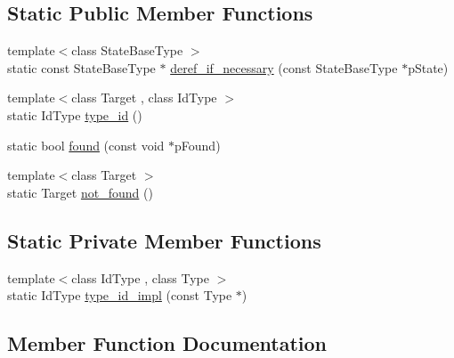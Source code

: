 \subsection*{Static Public Member Functions}
\begin{DoxyCompactItemize}
\item 
{\footnotesize template$<$class State\+Base\+Type $>$ }\\static const State\+Base\+Type $\ast$ \mbox{\hyperlink{structboost_1_1statechart_1_1detail_1_1state__cast__impl__pointer__target_aa7118ebdb27108d1a0e20a853fde3071}{deref\+\_\+if\+\_\+necessary}} (const State\+Base\+Type $\ast$p\+State)
\item 
{\footnotesize template$<$class Target , class Id\+Type $>$ }\\static Id\+Type \mbox{\hyperlink{structboost_1_1statechart_1_1detail_1_1state__cast__impl__pointer__target_af1a7caed8267cb29225530abee224e5d}{type\+\_\+id}} ()
\item 
static bool \mbox{\hyperlink{structboost_1_1statechart_1_1detail_1_1state__cast__impl__pointer__target_a4d32641a2699dd5c182e3626bd04b250}{found}} (const void $\ast$p\+Found)
\item 
{\footnotesize template$<$class Target $>$ }\\static Target \mbox{\hyperlink{structboost_1_1statechart_1_1detail_1_1state__cast__impl__pointer__target_a83f6553a7f2603e78b54f4efef6ad6d6}{not\+\_\+found}} ()
\end{DoxyCompactItemize}
\subsection*{Static Private Member Functions}
\begin{DoxyCompactItemize}
\item 
{\footnotesize template$<$class Id\+Type , class Type $>$ }\\static Id\+Type \mbox{\hyperlink{structboost_1_1statechart_1_1detail_1_1state__cast__impl__pointer__target_ac2a0dae748341798d35ec7592c86d1fa}{type\+\_\+id\+\_\+impl}} (const Type $\ast$)
\end{DoxyCompactItemize}


\subsection{Member Function Documentation}
\mbox{\label{structboost_1_1statechart_1_1detail_1_1state__cast__impl__pointer__target_aa7118ebdb27108d1a0e20a853fde3071}} 
